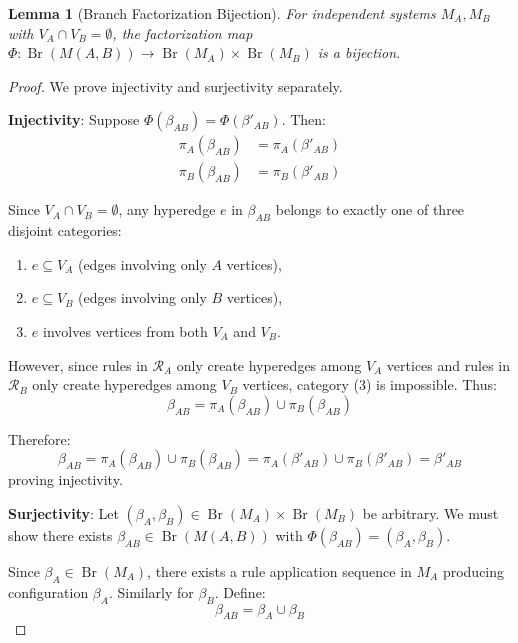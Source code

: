 \documentclass[11pt,a4paper]{article}
\newtheorem{lemma}[theorem]{Lemma}
\theoremstyle{definition}
\theoremstyle{remark}
\DeclareMathOperator{\Br}{Br}
\begin{document}
\begin{lemma}[Branch Factorization Bijection]
\label{lem:factorization_bijection}
For independent systems $M_A, M_B$ with $V_A \cap V_B = \emptyset$, the factorization map $\Phi: \Br(M(A,B)) \to \Br(M_A) \times \Br(M_B)$ is a bijection.
\end{lemma}

\begin{proof}
We prove injectivity and surjectivity separately.

\textbf{Injectivity}: Suppose $\Phi(\beta_{AB}) = \Phi(\beta'_{AB})$. Then:
\begin{align}
\pi_A(\beta_{AB}) &= \pi_A(\beta'_{AB}) \\
\pi_B(\beta_{AB}) &= \pi_B(\beta'_{AB})
\end{align}

Since $V_A \cap V_B = \emptyset$, any hyperedge $e$ in $\beta_{AB}$ belongs to exactly one of three disjoint categories:
\begin{enumerate}
\item $e \subseteq V_A$ (edges involving only $A$ vertices),
\item $e \subseteq V_B$ (edges involving only $B$ vertices),
\item $e$ involves vertices from both $V_A$ and $V_B$.
\end{enumerate}

However, since rules in $\mathcal{R}_A$ only create hyperedges among $V_A$ vertices and rules in $\mathcal{R}_B$ only create hyperedges among $V_B$ vertices, category (3) is impossible. Thus:
\begin{equation}
\beta_{AB} = \pi_A(\beta_{AB}) \cup \pi_B(\beta_{AB})
\end{equation}

Therefore:
\begin{equation}
\beta_{AB} = \pi_A(\beta_{AB}) \cup \pi_B(\beta_{AB}) = \pi_A(\beta'_{AB}) \cup \pi_B(\beta'_{AB}) = \beta'_{AB}
\end{equation}
proving injectivity.

\textbf{Surjectivity}: Let $(\beta_A, \beta_B) \in \Br(M_A) \times \Br(M_B)$ be arbitrary. We must show there exists $\beta_{AB} \in \Br(M(A,B))$ with $\Phi(\beta_{AB}) = (\beta_A, \beta_B)$.

Since $\beta_A \in \Br(M_A)$, there exists a rule application sequence in $M_A$ producing configuration $\beta_A$. Similarly for $\beta_B$. Define:
\begin{equation}
\beta_{AB} = \beta_A \cup \beta_B
\end{equation}


\end{proof}
\end{document}
